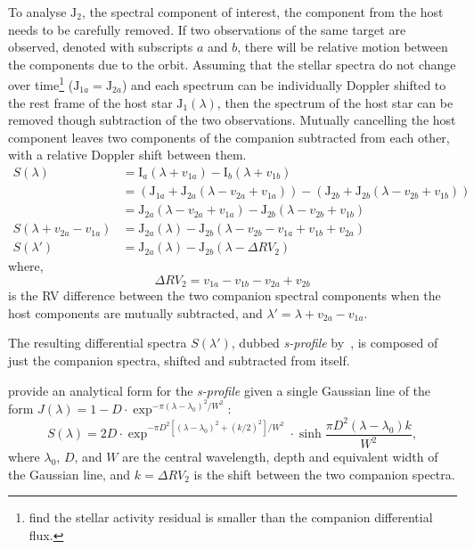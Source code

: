 To analyse \(\textrm{J}_2\), the spectral component of interest, the component from the host needs to be carefully removed.
If two observations of the same target are observed, denoted with subscripts \(a\) and \(b\), there will be relative motion between the components due to the orbit.
Assuming that the stellar spectra do not change over time\footnote{\citep{kostogryz_spectral_2013} find the stellar activity residual is smaller than the companion differential flux.} (\(\textrm{J}_{1a} = \textrm{J}_{2a}\)) and each spectrum can be individually Doppler shifted to the rest frame of the host star \(\textrm{J}_{1}(\lambda)\), then the spectrum of the host star can be removed though subtraction of the two observations.
Mutually cancelling the host component leaves two components of the companion subtracted from each other, with a relative Doppler shift between them.
\begin{align}
S(\lambda) &= \textrm{I}_{a}(\lambda + v_{1a}) - \textrm{I}_{b}(\lambda + v_{1b}) \nonumber \\
&= (\textrm{J}_{1a} + \textrm{J}_{2a}(\lambda - v_{2a} + v_{1a})) - (\textrm{J}_{2b} +\textrm{J}_{2b}(\lambda - v_{2b} + v_{1b})) \nonumber \\
&= \textrm{J}_{2a}(\lambda - v_{2a} + v_{1a}) - \textrm{J}_{2b}(\lambda - v_{2b} + v_{1b}) \nonumber \\
S(\lambda + v_{2a}-v_{1a}) &= \textrm{J}_{2a}(\lambda) - \textrm{J}_{2b}(\lambda - v_{2b} - v_{1a} + v_{1b} + v_{2a})\\
S(\lambda') &= \textrm{J}_{2a}(\lambda) - \textrm{J}_{2b}(\lambda - \Delta {RV}_2) \label{eqn:sprofile}
\end{align}
where,
\begin{equation}
\Delta {RV}_2 = v_{1a} - v_{1b} - v_{2a} + v_{2b} \label{eqn:companion_difference}
\end{equation}
is the {RV} difference between the two companion spectral components when the host components are mutually subtracted,
and \(\lambda' = \lambda + v_{2a}-v_{1a}\).

The resulting differential spectra \(S({\lambda'})\), dubbed \emph{s-profile} by~\citet{ferluga_separating_1997}, is composed of just the companion spectra, shifted and subtracted from itself.

\citet{ferluga_separating_1997} provide an analytical form for the \emph{s-profile} given a single Gaussian line of the form
$J(\lambda) = 1- D \cdot\exp^{{-\pi {(\lambda - \lambda_0)}^2} / {{W}^{2}}}$:
\begin{equation}
    S(\lambda) = 2 D\cdot\exp^{{-\pi {D}^{2} [{(\lambda - \lambda_0)}^{2} +{(k/2)}^{2}]}/{{W}^{2}}} \cdot \sinh{\frac{\pi {D}^{2}(\lambda-\lambda_0)k}{{W}^{2}}},\label{eqn:sprofile_gaussain}
\end{equation}
where $\lambda_0$, $D$, and $W$ are the central wavelength, depth and equivalent width of the Gaussian line, and $k=\Delta {RV}_2 $ is the shift between the two companion spectra.

